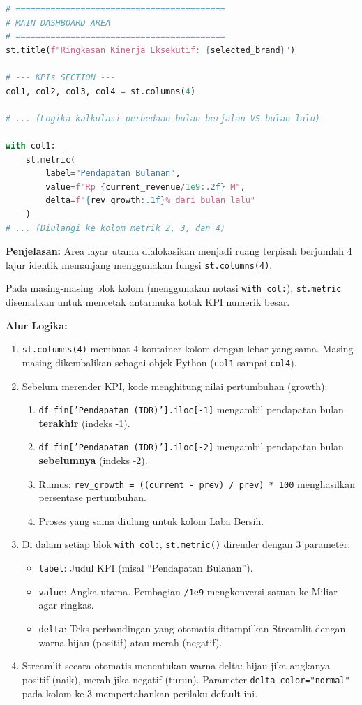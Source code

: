 \documentclass{article}
\begin{document}
\begin{lstlisting}[language=Python]
# ==========================================
# MAIN DASHBOARD AREA
# ==========================================
st.title(f"Ringkasan Kinerja Eksekutif: {selected_brand}")

# --- KPIs SECTION ---
col1, col2, col3, col4 = st.columns(4)

# ... (Logika kalkulasi perbedaan bulan berjalan VS bulan lalu)

with col1:
    st.metric(
        label="Pendapatan Bulanan", 
        value=f"Rp {current_revenue/1e9:.2f} M", 
        delta=f"{rev_growth:.1f}% dari bulan lalu"
    )
# ... (Diulangi ke kolom metrik 2, 3, dan 4)
\end{lstlisting}

\textbf{Penjelasan:}
Area layar utama dialokasikan menjadi ruang terpisah berjumlah 4 lajur identik memanjang menggunakan fungsi \texttt{st.columns(4)}.

Pada masing-masing blok kolom (menggunakan notasi \texttt{with col:}), \texttt{st.metric} disematkan untuk mencetak antarmuka kotak KPI numerik besar.

\textbf{Alur Logika:}
\begin{enumerate}
	\item \texttt{st.columns(4)} membuat 4 kontainer kolom dengan lebar yang sama. Masing-masing dikembalikan sebagai objek Python (\texttt{col1} sampai \texttt{col4}).
	\item Sebelum merender KPI, kode menghitung nilai pertumbuhan (growth):
	      \begin{enumerate}
		      \item \texttt{df\_fin['Pendapatan (IDR)'].iloc[-1]} mengambil pendapatan bulan \textbf{terakhir} (indeks -1).
		      \item \texttt{df\_fin['Pendapatan (IDR)'].iloc[-2]} mengambil pendapatan bulan \textbf{sebelumnya} (indeks -2).
		      \item Rumus: \texttt{rev\_growth = ((current - prev) / prev) * 100} menghasilkan persentase pertumbuhan.
		      \item Proses yang sama diulang untuk kolom Laba Bersih.
	      \end{enumerate}
	\item Di dalam setiap blok \texttt{with col:}, \texttt{st.metric()} dirender dengan 3 parameter:
	      \begin{itemize}
		      \item \texttt{label}: Judul KPI (misal ``Pendapatan Bulanan'').
		      \item \texttt{value}: Angka utama. Pembagian \texttt{/1e9} mengkonversi satuan ke Miliar agar ringkas.
		      \item \texttt{delta}: Teks perbandingan yang otomatis ditampilkan Streamlit dengan warna hijau (positif) atau merah (negatif).
	      \end{itemize}
	\item Streamlit secara otomatis menentukan warna delta: hijau jika angkanya positif (naik), merah jika negatif (turun). Parameter \texttt{delta\_color="normal"} pada kolom ke-3 mempertahankan perilaku default ini.
\end{enumerate}
\end{document}
